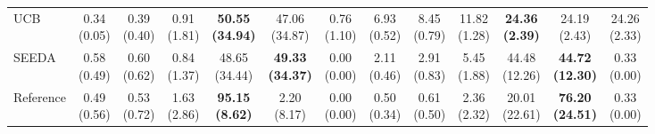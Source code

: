 {\begin{tabular}{l|cccccc|cccccc}
UCB & \makecell{0.34 \\ (0.05)} & \makecell{0.39 \\ (0.40)} & \makecell{0.91 \\ (1.81)} & {\cellcolor[HTML]{C8E6C9}} \bfseries \makecell{50.55 \\ (34.94)} & \makecell{47.06 \\ (34.87)} & \makecell{0.76 \\ (1.10)} & \makecell{6.93 \\ (0.52)} & \makecell{8.45 \\ (0.79)} & \makecell{11.82 \\ (1.28)} & {\cellcolor[HTML]{C8E6C9}} \bfseries \makecell{24.36 \\ (2.39)} & \makecell{24.19 \\ (2.43)} & \makecell{24.26 \\ (2.33)} \\
SEEDA & \makecell{0.58 \\ (0.49)} & \makecell{0.60 \\ (0.62)} & \makecell{0.84 \\ (1.37)} & {\cellcolor[HTML]{C8E6C9}} \makecell{48.65 \\ (34.44)} & \bfseries \makecell{49.33 \\ (34.37)} & \makecell{0.00 \\ (0.00)} & \makecell{2.11 \\ (0.46)} & \makecell{2.91 \\ (0.83)} & \makecell{5.45 \\ (1.88)} & {\cellcolor[HTML]{C8E6C9}} \makecell{44.48 \\ (12.26)} & \bfseries \makecell{44.72 \\ (12.30)} & \makecell{0.33 \\ (0.00)} \\
Reference & \makecell{0.49 \\ (0.56)} & \makecell{0.53 \\ (0.72)} & \makecell{1.63 \\ (2.86)} & {\cellcolor[HTML]{C8E6C9}} \bfseries \makecell{95.15 \\ (8.62)} & \makecell{2.20 \\ (8.17)} & \makecell{0.00 \\ (0.00)} & \makecell{0.50 \\ (0.34)} & \makecell{0.61 \\ (0.50)} & \makecell{2.36 \\ (2.32)} & {\cellcolor[HTML]{C8E6C9}} \makecell{20.01 \\ (22.61)} & \bfseries \makecell{76.20 \\ (24.51)} & \makecell{0.33 \\ (0.00)} \\

\end{tabular}}
